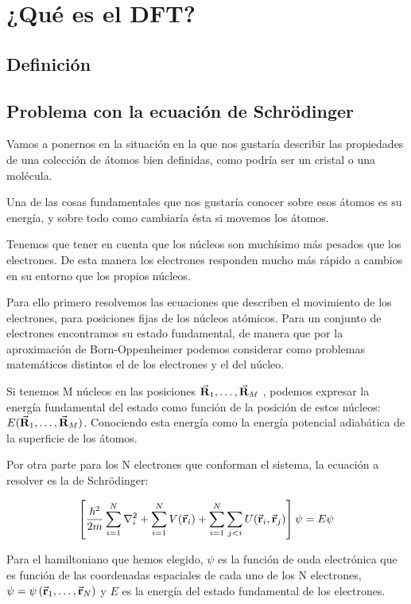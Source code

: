 \section{¿Qué es el DFT?}

\subsection{Definición}

\subsection{Problema con la ecuación de Schrödinger} 

Vamos a ponernos en la situación en la que nos gustaría describir las propiedades de una colección de átomos bien definidas, como podría ser un cristal o una molécula.

Una de las cosas fundamentales que nos gustaría conocer sobre esos átomos es su energía, y sobre todo como cambiaría ésta si movemos los átomos.

Tenemos que tener en cuenta que los núcleos son muchísimo más pesados que los electrones. De esta manera los electrones responden mucho más rápido a cambios en su entorno que los propios núcleos.

Para ello primero resolvemos las ecuaciones que describen el movimiento de los electrones, para posiciones fijas de los núcleos atómicos. Para un conjunto de electrones encontramos su estado fundamental, de manera que por la aproximación de Born-Oppenheimer podemos considerar como problemas matemáticos distintos el de los electrones y el del núcleo.

Si tenemos M núcleos en las posiciones $\va{R}_1 , \dots , \va{R}_M$ , podemos expresar la energía fundamental del estado como función de la posición de estos núcleos: $E(\va{R}_1 , \dots , \va{R}_M)$. Conociendo esta energía como la energía potencial adiabática de la superficie de los átomos.

Por otra parte para los N electrones que conforman el sistema, la ecuación a resolver es la de Schrödinger: 

\begin{equation}
    \left[ \frac{\hbar^2}{2m} \sum_{i=1}^{N} \laplacian_i + \sum_{i=1}^{N} V(\va{r}_i) + \sum_{i=1}^{N} \sum_{j<i} U(\va{r}_i , \va{r}_j) \right] \psi = E \psi
\end{equation}


Para el hamiltoniano que hemos elegido, $\psi$ es la función de onda electrónica que es función de las coordenadas espaciales de cada uno de los N electrones, $\psi = \psi \left( \va{r}_{1} , \dots , \va{r}_{N} \right)$  y $E$ es la energía del estado fundamental de los electrones.

